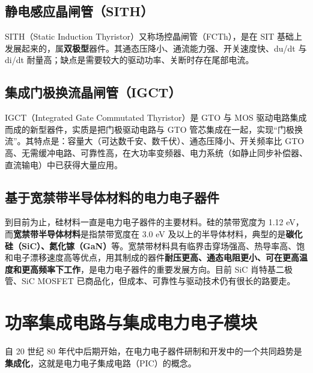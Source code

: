 \subsection{静电感应晶闸管（SITH）}

SITH（Static Induction Thyristor）又称场控晶闸管（FCTh），是在 SIT 基础上发展起来的，属\textbf{双极型}器件。其通态压降小、通流能力强、开关速度快、du/dt 与 di/dt 耐量高；缺点是需要较大的驱动功率、关断时存在尾部电流。

\subsection{集成门极换流晶闸管（IGCT）}

IGCT（Integrated Gate Commutated Thyristor）是 GTO 与 MOS 驱动电路集成而成的新型器件，实质是把门极驱动电路与 GTO 管芯集成在一起，实现“门极换流”。其特点是：容量大（可达数千安、数千伏）、通态压降小、开关频率比 GTO 高、无需缓冲电路、可靠性高，在大功率变频器、电力系统（如静止同步补偿器、直流输电）中已获得大量应用。

\subsection{基于宽禁带半导体材料的电力电子器件}

到目前为止，硅材料一直是电力电子器件的主要材料。硅的禁带宽度为 1.12 eV，而\textbf{宽禁带半导体材料}是指禁带宽度在 3.0 eV 及以上的半导体材料，典型的是\textbf{碳化硅（SiC）、氮化镓（GaN）}等。宽禁带材料具有临界击穿场强高、热导率高、饱和电子漂移速度高等优点，用其制成的器件\textbf{耐压更高、通态电阻更小、可在更高温度和更高频率下工作}，是电力电子器件的重要发展方向。目前 SiC 肖特基二极管、SiC MOSFET 已商品化，但成本、可靠性与驱动技术仍有很长的路要走。

\section{功率集成电路与集成电力电子模块}

自 20 世纪 80 年代中后期开始，在电力电子器件研制和开发中的一个共同趋势是\textbf{集成化}，这就是电力电子集成电路（PIC）的概念。

